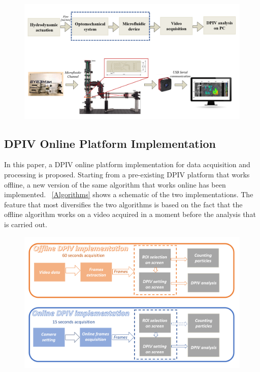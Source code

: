\documentclass[journal]{IEEEtran}
\theoremstyle{definition}
\theoremstyle{remark}
\begin{document}
\begin{figure}[h]
	\centering
	\includegraphics[width=1\columnwidth]{images/Platform}
\end{figure}


\subsection{DPIV Online Platform Implementation}\label{sec:method}
In this paper, a DPIV online platform implementation for data acquisition and processing is proposed. Starting from a pre-existing DPIV platform that works offline, a new version of the same algorithm
that works online has been implemented. ~\fig\ref{Algorithms} shows a schematic of the two implementations. The feature that most diversifies the two algorithms is based on the fact that the offline algorithm works on a video acquired in a moment before the analysis that is carried out.

\begin{figure}[h]
	\centering
	\includegraphics[width=1\columnwidth]{images/DPIV}
\end{figure}
\end{document}

